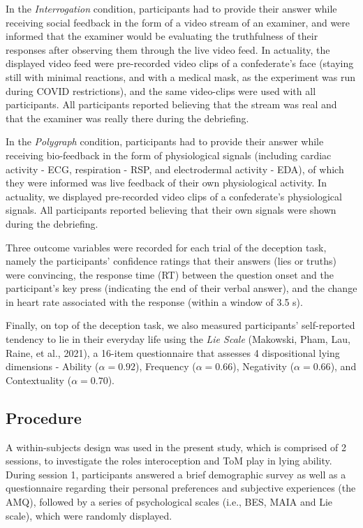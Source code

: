 \documentclass[
  man,mask,floatsintext]{apa6}
\begin{document}
In the \emph{Interrogation} condition, participants had to provide their answer while receiving social feedback in the form of a video stream of an examiner, and were informed that the examiner would be evaluating the truthfulness of their responses after observing them through the live video feed. In actuality, the displayed video feed were pre-recorded video clips of a confederate's face (staying still with minimal reactions, and with a medical mask, as the experiment was run during COVID restrictions), and the same video-clips were used with all participants. All participants reported believing that the stream was real and that the examiner was really there during the debriefing.

In the \emph{Polygraph} condition, participants had to provide their answer while receiving bio-feedback in the form of physiological signals (including cardiac activity - ECG, respiration - RSP, and electrodermal activity - EDA), of which they were informed was live feedback of their own physiological activity. In actuality, we displayed pre-recorded video clips of a confederate's physiological signals. All participants reported believing that their own signals were shown during the debriefing.

Three outcome variables were recorded for each trial of the deception task, namely the participants' confidence ratings that their answers (lies or truths) were convincing, the response time (RT) between the question onset and the participant's key press (indicating the end of their verbal answer), and the change in heart rate associated with the response (within a window of 3.5 s).

Finally, on top of the deception task, we also measured participants' self-reported tendency to lie in their everyday life using the \emph{Lie Scale} (Makowski, Pham, Lau, Raine, et al., 2021), a 16-item questionnaire that assesses 4 dispositional lying dimensions - Ability (\(\alpha = 0.92\)), Frequency (\(\alpha = 0.66\)), Negativity (\(\alpha = 0.66\)), and Contextuality (\(\alpha = 0.70\)).

\subsection{Procedure}\label{procedure}

A within-subjects design was used in the present study, which is comprised of 2 sessions, to investigate the roles interoception and ToM play in lying ability. During session 1, participants answered a brief demographic survey as well as a questionnaire regarding their personal preferences and subjective experiences (the AMQ), followed by a series of psychological scales (i.e., BES, MAIA and Lie scale), which were randomly displayed.
\end{document}
